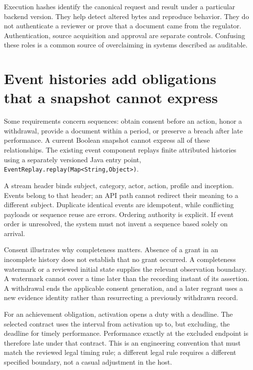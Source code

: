 Execution hashes identify the canonical request and result under a particular
backend version. They help detect altered bytes and reproduce behavior. They do
not authenticate a reviewer or prove that a document came from the regulator.
Authentication, source acquisition and approval are separate controls. Confusing
these roles is a common source of overclaiming in systems described as auditable.

\section{Event histories add obligations that a snapshot cannot express}

Some requirements concern sequences: obtain consent before an action, honor a
withdrawal, provide a document within a period, or preserve a breach after late
performance. A current Boolean snapshot cannot express all of these relationships.
The existing event component replays finite attributed histories using a separately
versioned Java entry point, \texttt{EventReplay.replay(Map<String,Object>)}.

A stream header binds subject, category, actor, action, profile and inception.
Events belong to that header; an API path cannot redirect their meaning to a
different subject. Duplicate identical events are idempotent, while conflicting
payloads or sequence reuse are errors. Ordering authority is explicit. If event
order is unresolved, the system must not invent a sequence based solely on arrival.

Consent illustrates why completeness matters. Absence of a grant in an incomplete
history does not establish that no grant occurred. A completeness watermark or a
reviewed initial state supplies the relevant observation boundary. A watermark
cannot cover a time later than the recording instant of its assertion. A
withdrawal ends the applicable consent generation, and a later regrant uses a new
evidence identity rather than resurrecting a previously withdrawn record.

For an achievement obligation, activation opens a duty with a deadline. The
selected contract uses the interval from activation up to, but excluding, the
deadline for timely performance. Performance exactly at the excluded endpoint is
therefore late under that contract. This is an engineering convention that must
match the reviewed legal timing rule; a different legal rule requires a different
specified boundary, not a casual adjustment in the host.

